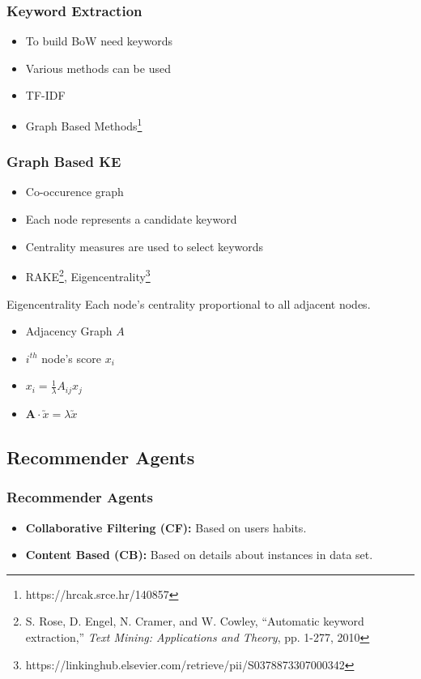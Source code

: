 \documentclass{beamer}
\begin{document}
\begin{frame}
    \frametitle{Keyword Extraction}
    \begin{itemize}
        \item To build BoW need keywords
        \item Various methods can be used
        \item TF-IDF
        \item Graph Based Methods\footnote{https://hrcak.srce.hr/140857}
    \end{itemize}
\end{frame}

\begin{frame}
    \frametitle{Graph Based KE}
    \begin{itemize}
        \item Co-occurence graph
        \item Each node represents a candidate keyword
        \item Centrality measures are used to select keywords
        \item RAKE\footnote{ S. Rose, D. Engel, N. Cramer, and W. Cowley, 
        ``Automatic keyword extraction,'' \emph{Text Mining:
        Applications and Theory}, pp. 1-277, 2010}, Eigencentrality\footnote{https://linkinghub.elsevier.com/retrieve/pii/S0378873307000342}
    \end{itemize}
    \begin{block}{Eigencentrality}
        Each node's centrality proportional to all adjacent nodes.
        \begin{itemize}
            \item Adjacency Graph $A$ 
            \item $i^{th}$ node's score $x_i$ 
            \item $x_i = \frac{1}{\lambda}A_{ij}x_j$
            \item $\textbf{A}\cdot \utilde{x} = \lambda \utilde{x}$
        \end{itemize}

    \end{block}
\end{frame}

\subsection{Recommender Agents}
\begin{frame}
    \frametitle{Recommender Agents}
    \begin{itemize}
        \item \textbf{Collaborative Filtering (CF): }Based on users habits.
        \item \textbf{Content Based (CB): }Based on details about instances in data set.
    \end{itemize}
\end{frame}
\end{document}
